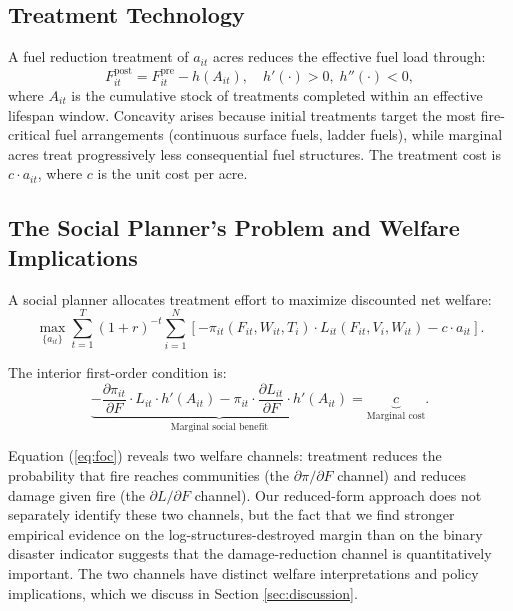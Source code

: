 \documentclass[12pt, letterpaper]{article}
\begin{document}
\subsection{Treatment Technology}

A fuel reduction treatment of $a_{it}$ acres reduces the effective fuel load through:
\begin{equation}
F_{it}^{\text{post}} = F_{it}^{\text{pre}} - h(A_{it}), \quad h'(\cdot) > 0, \; h''(\cdot) < 0,
\label{eq:fuel_tech}
\end{equation}
where $A_{it}$ is the cumulative stock of treatments completed within an effective lifespan window. Concavity arises because initial treatments target the most fire-critical fuel arrangements (continuous surface fuels, ladder fuels), while marginal acres treat progressively less consequential fuel structures. The treatment cost is $c \cdot a_{it}$, where $c$ is the unit cost per acre.

\subsection{The Social Planner's Problem and Welfare Implications}

A social planner allocates treatment effort to maximize discounted net welfare:
\begin{equation}
\max_{\{a_{it}\}} \sum_{t=1}^{T} (1+r)^{-t} \sum_{i=1}^{N} \left[ -\pi_{it}(F_{it}, W_{it}, T_i) \cdot L_{it}(F_{it}, V_i, W_{it}) - c \cdot a_{it} \right].
\label{eq:social_planner}
\end{equation}

The interior first-order condition is:
\begin{equation}
\underbrace{-\frac{\partial \pi_{it}}{\partial F} \cdot L_{it} \cdot h'(A_{it}) - \pi_{it} \cdot \frac{\partial L_{it}}{\partial F} \cdot h'(A_{it})}_{\text{Marginal social benefit}} = \underbrace{c}_{\text{Marginal cost}}.
\label{eq:foc}
\end{equation}

Equation (\ref{eq:foc}) reveals two welfare channels: treatment reduces the probability that fire reaches communities (the $\partial \pi / \partial F$ channel) and reduces damage given fire (the $\partial L / \partial F$ channel). Our reduced-form approach does not separately identify these two channels, but the fact that we find stronger empirical evidence on the log-structures-destroyed margin than on the binary disaster indicator suggests that the damage-reduction channel is quantitatively important. The two channels have distinct welfare interpretations and policy implications, which we discuss in Section \ref{sec:discussion}.
\end{document}
